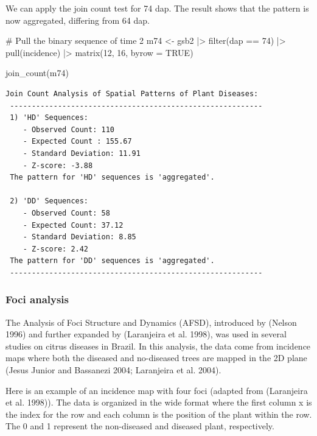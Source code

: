 \documentclass[
  letterpaper,
]{book}
\newenvironment{Shaded}{\begin{snugshade}}{\end{snugshade}}
\newcommand{\AttributeTok}[1]{\textcolor[rgb]{0.40,0.45,0.13}{#1}}
\newcommand{\CommentTok}[1]{\textcolor[rgb]{0.37,0.37,0.37}{#1}}
\newcommand{\ConstantTok}[1]{\textcolor[rgb]{0.56,0.35,0.01}{#1}}
\newcommand{\DecValTok}[1]{\textcolor[rgb]{0.68,0.00,0.00}{#1}}
\newcommand{\FunctionTok}[1]{\textcolor[rgb]{0.28,0.35,0.67}{#1}}
\newcommand{\NormalTok}[1]{\textcolor[rgb]{0.00,0.23,0.31}{#1}}
\newcommand{\OtherTok}[1]{\textcolor[rgb]{0.00,0.23,0.31}{#1}}
\newcommand{\SpecialCharTok}[1]{\textcolor[rgb]{0.37,0.37,0.37}{#1}}
\begin{document}
We can apply the join count test for 74 dap. The result shows that the
pattern is now aggregated, differing from 64 dap.

\begin{Shaded}
\begin{Highlighting}[]
\CommentTok{\# Pull the binary sequence of time 2}
\NormalTok{m74 }\OtherTok{\textless{}{-}}\NormalTok{ gsb2 }\SpecialCharTok{|\textgreater{}} 
  \FunctionTok{filter}\NormalTok{(dap }\SpecialCharTok{==} \DecValTok{74}\NormalTok{) }\SpecialCharTok{|\textgreater{}} 
  \FunctionTok{pull}\NormalTok{(incidence) }\SpecialCharTok{|\textgreater{}} 
  \FunctionTok{matrix}\NormalTok{(}\DecValTok{12}\NormalTok{, }\DecValTok{16}\NormalTok{, }\AttributeTok{byrow =} \ConstantTok{TRUE}\NormalTok{)}

\FunctionTok{join\_count}\NormalTok{(m74)}
\end{Highlighting}
\end{Shaded}

\begin{verbatim}
Join Count Analysis of Spatial Patterns of Plant Diseases:
 ----------------------------------------------------------
 1) 'HD' Sequences:
    - Observed Count: 110
    - Expected Count : 155.67
    - Standard Deviation: 11.91
    - Z-score: -3.88
 The pattern for 'HD' sequences is 'aggregated'.

 2) 'DD' Sequences:
    - Observed Count: 58
    - Expected Count: 37.12
    - Standard Deviation: 8.85
    - Z-score: 2.42
 The pattern for 'DD' sequences is 'aggregated'.
 ----------------------------------------------------------
\end{verbatim}

\hypertarget{foci-analysis}{%
\subsubsection{Foci analysis}\label{foci-analysis}}

The Analysis of Foci Structure and Dynamics (AFSD), introduced by
(Nelson 1996) and further expanded by (Laranjeira et al. 1998), was used
in several studies on citrus diseases in Brazil. In this analysis, the
data come from incidence maps where both the diseased and no-diseased
trees are mapped in the 2D plane (Jesus Junior and Bassanezi 2004;
Laranjeira et al. 2004).

Here is an example of an incidence map with four foci (adapted from
(Laranjeira et al. 1998)). The data is organized in the wide format
where the first column x is the index for the row and each column is the
position of the plant within the row. The 0 and 1 represent the
non-diseased and diseased plant, respectively.
\end{document}

